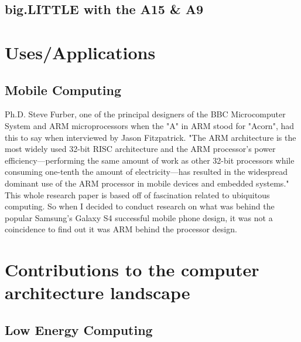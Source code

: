 \documentclass[12pt]{scrreprt}
\begin{document}
	\section{big.LITTLE with the A15 \& A9}

\chapter{Uses/Applications}

	\section{Mobile Computing}

	Ph.D. Steve Furber, one of the principal designers of the BBC Microcomputer System and ARM microprocessors when the "A" in ARM stood for 
	"Acorn", had this to say when interviewed by Jason Fitzpatrick. "The ARM architecture is the most widely used 32-bit RISC architecture and the ARM processor's power efficiency—performing the same amount of work as other 32-bit processors while consuming one-tenth the amount of electricity—has resulted in the widespread dominant use of the ARM processor in mobile devices and embedded systems." This whole research paper is based off of fascination related to ubiquitous computing. So when I decided to conduct research on what was behind the popular Samsung's Galaxy S4 successful mobile phone design, it was not a coincidence to find out it was ARM behind the processor design.


\chapter{Contributions to the computer architecture landscape}

	\section{Low Energy Computing}
\end{document}
